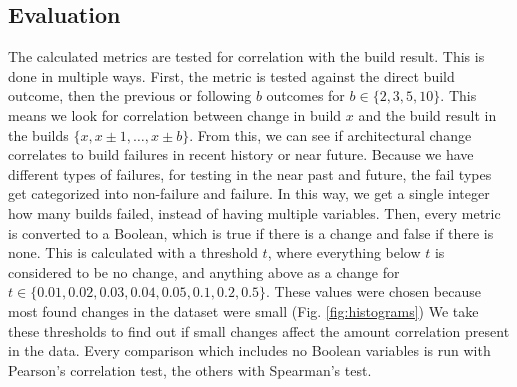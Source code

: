 \documentclass[sigplan, anonymous, review]{acmart}
\begin{document}
\subsection{Evaluation}

The calculated metrics are tested for correlation with the build result. This is done in multiple ways. First, the metric is tested against the direct build outcome, then the previous or following $b$ outcomes for $b \in \{2, 3, 5, 10\}$. This means we look for correlation between change in build $x$ and the build result in the builds $\{x, x \pm 1, \hdots, x \pm b\}$. From this, we can see if architectural change correlates to build failures in recent history or near future. 
Because we have different types of failures, for testing in the near past and future, the fail types get categorized into non-failure and failure. In this way, we get a single integer how many builds failed, instead of having multiple variables. 
Then, every metric is converted to a Boolean, which is true if there is a change and false if there is none. This is calculated with a threshold $t$, where everything below $t$ is considered to be no change, and anything above as a change for $t \in \{0.01, 0.02, 0.03, 0.04, 0.05, 0.1, 0.2, 0.5\}$. These values were chosen because most found changes in the dataset were small (Fig. \ref{fig:histograms}) We take these thresholds to find out if small changes affect the amount correlation present in the data. Every comparison which includes no Boolean variables is run with Pearson's correlation test, the others with Spearman's test. 
\end{document}
